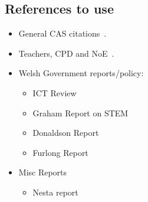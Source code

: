 \documentclass{sig-alternate}
\begin{document}
\subsection*{References to use}
\begin{itemize}
\item
General CAS
citations~\cite{crick+sentance:2011,brown-et-al-sigcse2012,brown-et-al-toce2014}.

\item
Teachers, CPD and
NoE~\cite{sentance-et-al-wipsce2012,sentance-et-al:2013,sentance-et-al:2014}.

\item
Welsh Government reports/policy:
\begin{itemize}
\item
ICT Review~\cite{welshictreview:2013}
\item
Graham Report on STEM~\cite{STEMreview:2014}
\item
Donaldson Report~\cite{Donaldson:2015}
\item
Furlong Report~\cite{Furlong:2015}
\end{itemize}

\item
Misc Reports
\begin{itemize}
\item
Nesta report~\cite{NESTA:2015}

\end{itemize}
\end{itemize}
\end{document}
